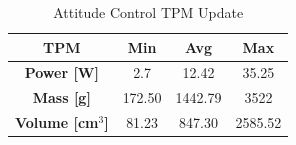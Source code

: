 \documentclass[conf]{new-aiaa}
\begin{document}



\begin{table}[H]
 \centering
 \caption{Attitude Control TPM Update}
\begin{tabular}{ |c|c|c|c|  }
 \hline
 \textbf{TPM} & \textbf{Min} & \textbf{Avg} & \textbf{Max} \\
 \hline
 \textbf{Power [W]} & 2.7& 12.42& 35.25\\
 \hline
 \textbf{Mass [g]} & 172.50& 1442.79& 3522\\
 \hline
 \textbf{Volume [cm$^3$]} & 81.23& 847.30& 2585.52\\
 \hline
\end{tabular}
\label{t:AC_TPM_Update3}
\end{table}
\end{document}
